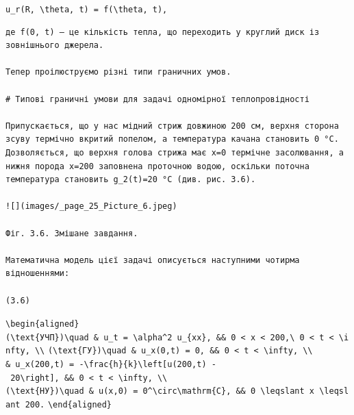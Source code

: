 \documentclass[
  ukrainian,
]{article}
\begin{document}
\texttt{u\_r(R,\ \textbackslash{}theta,\ t)\ =\ f(\textbackslash{}theta,\ t),}

\begin{verbatim}
де f(0, t) — це кількість тепла, що переходить у круглий диск із зовнішнього джерела.

Тепер проілюструємо різні типи граничних умов.

# Типові граничні умови для задачі одномірної теплопровідності

Припускається, що у нас мідний стриж довжиною 200 см, верхня сторона зсуву термічно вкритий попелом, а температура качана становить 0 °C. Дозволяється, що верхня голова стрижа має x=0 термічне засолювання, а нижня порода x=200 заповнена проточною водою, оскільки поточна температура становить g_2(t)=20 °C (див. рис. 3.6).

![](images/_page_25_Picture_6.jpeg)

Фіг. 3.6. Змішане завдання.

Математична модель цієї задачі описується наступними чотирма відношеннями:

(3.6)
\end{verbatim}

\texttt{\textbackslash{}begin\{aligned\}}
\texttt{(\textbackslash{}text\{УЧП\})\textbackslash{}quad\ \&\ u\_t\ =\ \textbackslash{}alpha\^{}2\ u\_\{xx\},\ \&\&\ 0\ \textless{}\ x\ \textless{}\ 200,\textbackslash{}\ 0\ \textless{}\ t\ \textless{}\ \textbackslash{}infty,\ \textbackslash{}\textbackslash{}}
\texttt{(\textbackslash{}text\{ГУ\})\textbackslash{}quad\ \&\ u\_x(0,t)\ =\ 0,\ \&\&\ 0\ \textless{}\ t\ \textless{}\ \textbackslash{}infty,\ \textbackslash{}\textbackslash{}}
\texttt{\&\ u\_x(200,t)\ =\ -\textbackslash{}frac\{h\}\{k\}\textbackslash{}left{[}u(200,t)\ -\ 20\textbackslash{}right{]},\ \&\&\ 0\ \textless{}\ t\ \textless{}\ \textbackslash{}infty,\ \textbackslash{}\textbackslash{}}
\texttt{(\textbackslash{}text\{НУ\})\textbackslash{}quad\ \&\ u(x,0)\ =\ 0\^{}\textbackslash{}circ\textbackslash{}mathrm\{C\},\ \&\&\ 0\ \textbackslash{}leqslant\ x\ \textbackslash{}leqslant\ 200.}
\texttt{\textbackslash{}end\{aligned\}}
\end{document}
